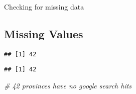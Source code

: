 \documentclass[
]{article}
\newenvironment{Shaded}{\begin{snugshade}}{\end{snugshade}}
\newcommand{\CommentTok}[1]{\textcolor[rgb]{0.56,0.35,0.01}{\textit{#1}}}
\newcommand{\FunctionTok}[1]{\textcolor[rgb]{0.00,0.00,0.00}{#1}}
\newcommand{\NormalTok}[1]{#1}
\newcommand{\SpecialCharTok}[1]{\textcolor[rgb]{0.00,0.00,0.00}{#1}}
\begin{document}
Checking for missing data

\hypertarget{missing-values}{%
\subsection{Missing Values}\label{missing-values}}

\begin{Shaded}
\end{Shaded}

\begin{verbatim}
## [1] 42
\end{verbatim}

\begin{Shaded}
\end{Shaded}

\begin{verbatim}
## [1] 42
\end{verbatim}

\begin{Shaded}
\begin{Highlighting}[]
\CommentTok{\# 42 provinces have no google search hits}
\end{Highlighting}
\end{Shaded}
\end{document}
